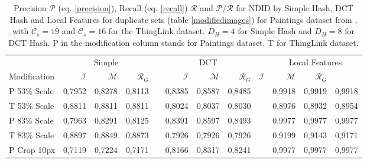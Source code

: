 \documentclass[english,12pt,a4paper,pdftex,elec,utf8, table]{aaltothesis}
\begin{document}

\begin{table} \footnotesize
\caption{ Precision $\mathcal{P}$ (eq. \ref{precision}), Recall (eq. \ref{recall}) $\mathcal{R}$ and $\mathcal{P}/\mathcal{R}$ for NDID by Simple Hash, DCT Hash and Local Features for duplicate sets (table \ref{modifiedimages}) for Paintings dataset from \cite{Vedaldi2012}, with $\mathcal{C}_s = 19$ and $\mathcal{C}_s = 16$ for the ThingLink dataset. $D_H = 4$ for Simple Hash and $D_H = 8$ for DCT Hash. P in the modification column stands for Paintings dataset. T for ThingLink dataset.}
\label{precisionrecall}
\begin{center}
  \setlength\tabcolsep{3pt} %
  \begin{tabular}{@{}lrrrrrrrrrrr@{}}
    \toprule
    & \multicolumn{3}{c}{Simple} &\phantom{abc} &\multicolumn{3}{c}{DCT} &\phantom{abc} & \multicolumn{3}{c}{Local Features}\\
\cmidrule{2-4} \cmidrule{6-8} \cmidrule{10-12}
 Modification & $\mathcal{I}$ & $\mathcal{M}$ & $\mathcal{R}_G$ &\phantom{abc} & $\mathcal{I}$ & $\mathcal{M}$ & $\mathcal{R}_G$ \phantom{abc} & $\mathcal{I}$ & $\mathcal{M}$ & $\mathcal{R}_G$\\ \midrule
 P 53\% Scale   & 0,7952 & 0,8278 & 0,8113 &\phantom{abc} & 0,8385 & 0,8587 & 0,8485 &\phantom{abc} & 0,9918 & 0,9919 & 0,9918\\
 T 53\% Scale   & 0,8811 & 0,8811 & 0,8811 &\phantom{abc} & 0,8024 & 0,8037 & 0,8030 &\phantom{abc} & 0,8976 & 0,8932 & 0,8954\\
 P 83\% Scale   & 0,7963 & 0,8291 & 0,8125 &\phantom{abc} & 0,8391& 0,8597& 0,8493 &\phantom{abc} & 0,9977 & 0,9977 & 0,9977 \\
 T 83\% Scale   & 0,8897 & 0,8849 & 0,8873 &\phantom{abc} & 0,7926 & 0,7926& 0,7926 &\phantom{abc} & 0,9199 & 0,9143 & 0,9171 \\
 P Crop 10px    & 0,7119 & 0,7224 & 0,7171 &\phantom{abc} & 0,8166 & 0,8317 & 0,8241 &\phantom{abc} & 0,9977 & 0,9977 & 0,9977 \\

\end{tabular}
\end{center}
\end{table}
\end{document}
